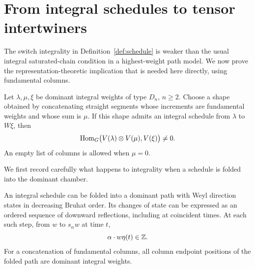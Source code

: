 \section{From integral schedules to tensor intertwiners}
\label{sec:columns}

The switch integrality in Definition~\ref{def:schedule} is weaker than
the usual integral saturated-chain condition in a highest-weight path
model.  We now prove the representation-theoretic implication that is
needed here directly, using fundamental columns.

\begin{proposition}\label{prop:columns}
Let $\lambda,\mu,\xi$ be dominant integral weights of type $D_n$,
$n\ge2$.  Choose a shape obtained by concatenating straight segments
whose increments are fundamental weights and whose sum is $\mu$.
If this shape admits an integral schedule from $\lambda$ to $W\xi$,
then
\[
 \operatorname{Hom}_G\bigl(V(\lambda)\otimes V(\mu),V(\xi)\bigr)\ne0.
\]
An empty list of columns is allowed when $\mu=0$.
\end{proposition}

We first record carefully what happens to integrality when a schedule
is folded into the dominant chamber.

\begin{lemma}\label{col:folding}
An integral schedule can be folded into a dominant path with Weyl
direction states in decreasing Bruhat order.  Its changes of state
can be expressed as an ordered sequence of downward reflections,
including at coincident times.  At each such step, from $w$ to
$s_\alpha w$ at time $t$,
\begin{equation}\label{col:folded-integrality}
 \alpha\cdot w\eta(t)\in\mathbb Z.
\end{equation}
For a concatenation of fundamental columns, all column endpoint
positions of the folded path are dominant integral weights.
\end{lemma}

